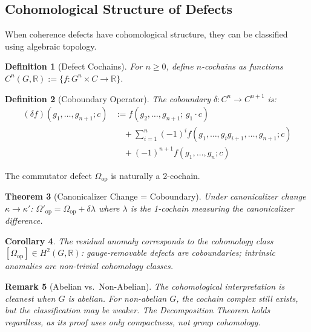 \documentclass[12pt]{article}
\newtheorem{theorem}{Theorem}
\newtheorem{corollary}[theorem]{Corollary}
\newtheorem{definition}[theorem]{Definition}
\newtheorem{remark}[theorem]{Remark}
\begin{document}
\subsection{Cohomological Structure of Defects}

When coherence defects have cohomological structure, they can be classified using algebraic topology.

\begin{definition}[Defect Cochains]
\emph{For $n \geq 0$, define $n$-cochains as functions $C^n(G, \mathbb{R}) := \{f\colon G^n \times C \to \mathbb{R}\}$.}
\end{definition}

\begin{definition}[Coboundary Operator]
\emph{The coboundary $\delta\colon C^n \to C^{n+1}$ is:}
\begin{align*}
(\delta f)(g_1, \ldots, g_{n+1}; c) &:= f(g_2, \ldots, g_{n+1};\, g_1 \cdot c) \\
&\quad + \sum_{i=1}^{n} (-1)^i f(g_1, \ldots, g_i g_{i+1}, \ldots, g_{n+1}; c) \\
&\quad + (-1)^{n+1} f(g_1, \ldots, g_n; c)
\end{align*}
\end{definition}

The commutator defect $\Omega_{\mathrm{op}}$ is naturally a 2-cochain.

\begin{theorem}[Canonicalizer Change = Coboundary]
\emph{Under canonicalizer change $\kappa \to \kappa'$}: $\Omega'_{\mathrm{op}} = \Omega_{\mathrm{op}} + \delta\lambda$ \emph{where $\lambda$ is the 1-cochain measuring the canonicalizer difference.}
\end{theorem}

\begin{corollary}
\emph{The residual anomaly corresponds to the cohomology class $[\Omega_{\mathrm{op}}] \in H^2(G, \mathbb{R})$: gauge-removable defects are coboundaries; intrinsic anomalies are non-trivial cohomology classes.}
\end{corollary}

\begin{remark}[Abelian vs.\ Non-Abelian]
\emph{The cohomological interpretation is cleanest when $G$ is abelian. For non-abelian $G$, the cochain complex still exists, but the classification may be weaker. The Decomposition Theorem holds regardless, as its proof uses only compactness, not group cohomology.}
\end{remark}
\end{document}
